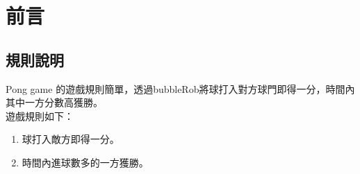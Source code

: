 \chapter{前言}
\renewcommand{\baselinestretch}{10.0} %
\setcounter{page}{1}  %
\fontsize{14pt}{2.5pt}\sectionef
\section{規則說明}
 Pong game 的遊戲規則簡單，透過bubbleRob將球打入對方球門即得一分，時間內其中一方分數高獲勝。\\
遊戲規則如下：
\begin{enumerate}
\item 球打入敵方即得一分。
\item 時間內進球數多的一方獲勝。
\end{enumerate}

\renewcommand{\baselinestretch}{0.5} %
